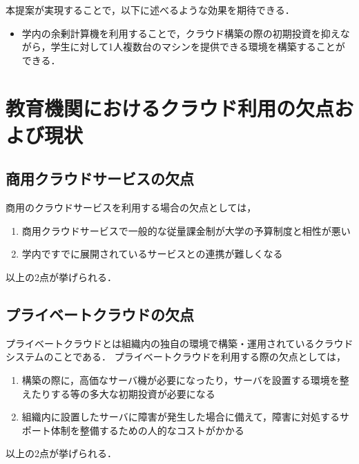 \documentclass[11pt,a4paper]{jsarticle}
\begin{document}
\par 本提案が実現することで，以下に述べるような効果を期待できる．
\begin{itemize}
	\item 学内の余剰計算機を利用することで，クラウド構築の際の初期投資を抑えながら，学生に対して1人複数台のマシンを提供できる環境を構築することができる．
\end{itemize}


\section{教育機関におけるクラウド利用の欠点および現状}
\subsection{商用クラウドサービスの欠点}
商用のクラウドサービスを利用する場合の欠点としては，
\begin{enumerate}
	\item 商用クラウドサービスで一般的な従量課金制が大学の予算制度と相性が悪い
	\item 学内ですでに展開されているサービスとの連携が難しくなる
\end{enumerate}
以上の2点が挙げられる．
\subsection{プライベートクラウドの欠点}
プライベートクラウドとは組織内の独自の環境で構築・運用されているクラウドシステムのことである．
プライベートクラウドを利用する際の欠点としては，
\begin{enumerate}
	\item 構築の際に，高価なサーバ機が必要になったり，サーバを設置する環境を整えたりする等の多大な初期投資が必要になる
	\item 組織内に設置したサーバに障害が発生した場合に備えて，障害に対処するサポート体制を整備するための人的なコストがかかる
\end{enumerate}
以上の2点が挙げられる．
\end{document}
